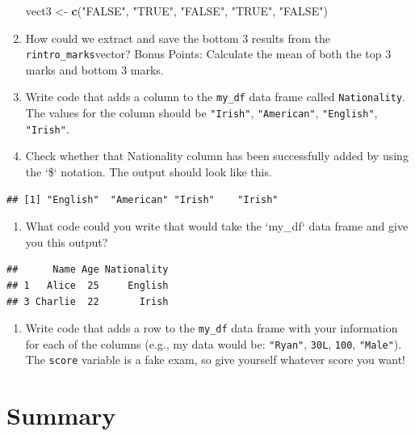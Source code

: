 \documentclass[
]{book}
\newenvironment{Shaded}{\begin{snugshade}}{\end{snugshade}}
\newcommand{\FunctionTok}[1]{\textcolor[rgb]{0.13,0.29,0.53}{\textbf{#1}}}
\newcommand{\NormalTok}[1]{#1}
\newcommand{\OtherTok}[1]{\textcolor[rgb]{0.56,0.35,0.01}{#1}}
\newcommand{\StringTok}[1]{\textcolor[rgb]{0.31,0.60,0.02}{#1}}
\providecommand{\tightlist}{%
  \setlength{\itemsep}{0pt}\setlength{\parskip}{0pt}}
\begin{document}
\begin{enumerate}
\begin{Shaded}
\begin{Highlighting}[]
\NormalTok{vect3 }\OtherTok{\textless{}{-}} \FunctionTok{c}\NormalTok{(}\StringTok{"FALSE"}\NormalTok{, }\StringTok{"TRUE"}\NormalTok{, }\StringTok{"FALSE"}\NormalTok{, }\StringTok{"TRUE"}\NormalTok{, }\StringTok{"FALSE"}\NormalTok{)}
\end{Highlighting}
\end{Shaded}
\item
  How could we extract and save the bottom 3 results from the \texttt{rintro\_marks}vector? Bonus Points: Calculate the mean of both the top 3 marks and bottom 3 marks.
\item
  Write code that adds a column to the \texttt{my\_df} data frame called \texttt{Nationality}. The values for the column should be \texttt{"Irish"}, \texttt{"American"}, \texttt{"English"}, \texttt{"Irish"}.
\item
  Check whether that Nationality column has been successfully added by using the `\$` notation. The output should look like this.
\end{enumerate}

\begin{verbatim}
## [1] "English"  "American" "Irish"    "Irish"
\end{verbatim}

\begin{enumerate}
\def\labelenumi{\arabic{enumi}.}
\setcounter{enumi}{4}
\tightlist
\item
  What code could you write that would take the `my\_df` data frame and give you this output?
\end{enumerate}

\begin{verbatim}
##      Name Age Nationality
## 1   Alice  25     English
## 3 Charlie  22       Irish
\end{verbatim}

\begin{enumerate}
\def\labelenumi{\arabic{enumi}.}
\setcounter{enumi}{5}
\tightlist
\item
  Write code that adds a row to the \texttt{my\_df} data frame with your information for each of the columns (e.g., my data would be: \texttt{"Ryan"}, \texttt{30L}, \texttt{100}, \texttt{"Male"}). The \texttt{score} variable is a fake exam, so give yourself whatever score you want!
\end{enumerate}

\hypertarget{summary-1}{%
\section{Summary}\label{summary-1}}
\end{document}
